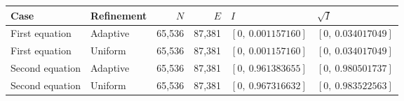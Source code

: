 \begin{tabular}{@{}llrrll@{}}\toprule
Case & Refinement & $N$ & $E$ & $I$ & $\sqrt I$\\\midrule
First equation & Adaptive & 65,536 & 87,381 & $[0,\ 0.001157160]$ & $[0,\ 0.034017049]$ \\
First equation & Uniform & 65,536 & 87,381 & $[0,\ 0.001157160]$ & $[0,\ 0.034017049]$ \\
Second equation & Adaptive & 65,536 & 87,381 & $[0,\ 0.961383655]$ & $[0,\ 0.980501737]$ \\
Second equation & Uniform & 65,536 & 87,381 & $[0,\ 0.967316632]$ & $[0,\ 0.983522563]$ \\
\bottomrule\end{tabular}

